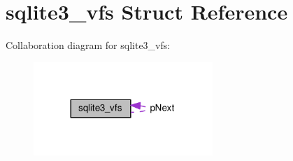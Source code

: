 \hypertarget{structsqlite3__vfs}{}\section{sqlite3\+\_\+vfs Struct Reference}
\label{structsqlite3__vfs}


Collaboration diagram for sqlite3\+\_\+vfs\+:\nopagebreak
\begin{figure}[H]
\begin{center}
\leavevmode
\includegraphics[width=192pt]{structsqlite3__vfs__coll__graph}
\end{center}
\end{figure}
